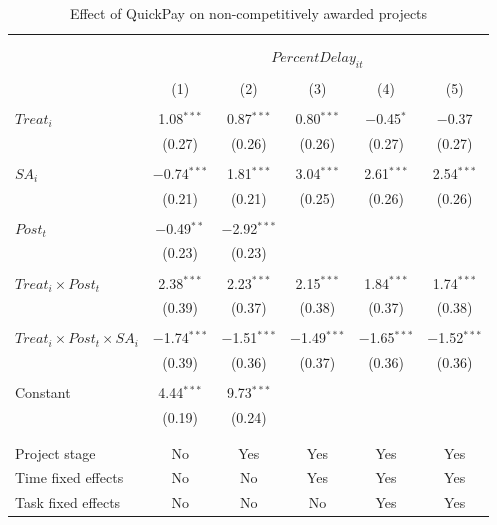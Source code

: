 \documentclass[
]{article}
\begin{document}
\begin{table}[H] \centering 
  \caption{Effect of QuickPay on non-competitively awarded projects} 
  \label{} 
\small 
\begin{tabular}{@{\extracolsep{-2pt}}lccccc} 
\\[-1.8ex]\hline 
\hline \\[-1.8ex] 
\\[-1.8ex] & \multicolumn{5}{c}{$PercentDelay_{it}$  } \\ 
\\[-1.8ex] & (1) & (2) & (3) & (4) & (5)\\ 
\hline \\[-1.8ex] 
 $Treat_i$ & 1.08$^{***}$ & 0.87$^{***}$ & 0.80$^{***}$ & $-$0.45$^{*}$ & $-$0.37 \\ 
  & (0.27) & (0.26) & (0.26) & (0.27) & (0.27) \\ 
  & & & & & \\ 
 $SA_i$ & $-$0.74$^{***}$ & 1.81$^{***}$ & 3.04$^{***}$ & 2.61$^{***}$ & 2.54$^{***}$ \\ 
  & (0.21) & (0.21) & (0.25) & (0.26) & (0.26) \\ 
  & & & & & \\ 
 $Post_t$ & $-$0.49$^{**}$ & $-$2.92$^{***}$ &  &  &  \\ 
  & (0.23) & (0.23) &  &  &  \\ 
  & & & & & \\ 
 $Treat_i \times Post_t$ & 2.38$^{***}$ & 2.23$^{***}$ & 2.15$^{***}$ & 1.84$^{***}$ & 1.74$^{***}$ \\ 
  & (0.39) & (0.37) & (0.38) & (0.37) & (0.38) \\ 
  & & & & & \\ 
 $Treat_i \times Post_t \times SA_i $ & $-$1.74$^{***}$ & $-$1.51$^{***}$ & $-$1.49$^{***}$ & $-$1.65$^{***}$ & $-$1.52$^{***}$ \\ 
  & (0.39) & (0.36) & (0.37) & (0.36) & (0.36) \\ 
  & & & & & \\ 
 Constant & 4.44$^{***}$ & 9.73$^{***}$ &  &  &  \\ 
  & (0.19) & (0.24) &  &  &  \\ 
  & & & & & \\ 
\hline \\[-1.8ex] 
Project stage & No & Yes & Yes & Yes & Yes \\ 
Time fixed effects & No & No & Yes & Yes & Yes \\ 
Task fixed effects & No & No & No & Yes & Yes \\ 

\end{tabular}
\end{table}
\end{document}
